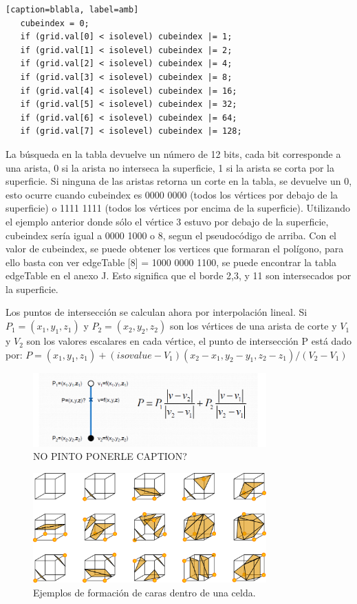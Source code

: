\documentclass[12pt]{article}
\begin{document}
\begin{lstlisting}[frame=single][caption=blabla, label=amb]
   cubeindex = 0;
   if (grid.val[0] < isolevel) cubeindex |= 1;
   if (grid.val[1] < isolevel) cubeindex |= 2;
   if (grid.val[2] < isolevel) cubeindex |= 4;
   if (grid.val[3] < isolevel) cubeindex |= 8;
   if (grid.val[4] < isolevel) cubeindex |= 16;
   if (grid.val[5] < isolevel) cubeindex |= 32;
   if (grid.val[6] < isolevel) cubeindex |= 64;
   if (grid.val[7] < isolevel) cubeindex |= 128;
\end{lstlisting}

La búsqueda en la tabla devuelve un número de 12 bits, cada bit corresponde a una arista, 0 si la arista no interseca la superficie, 1 si la arista se corta por la superficie. Si ninguna de las aristas retorna un corte en la tabla, se devuelve un 0, esto ocurre cuando cubeindex es 0000 0000 (todos los vértices por debajo de la superficie) o 1111 1111 (todos los vértices por encima de la superficie).
Utilizando el ejemplo anterior donde sólo el vértice 3 estuvo por debajo de la superficie, cubeindex sería igual a 0000 1000 o 8, segun el pseudocódigo de arriba. Con el valor de cubeindex, se puede obtener los vertices que formaran el polígono, para ello basta con ver edgeTable [8] = 1000 0000 1100, se puede encontrar la tabla edgeTable en el anexo J. Esto significa que el borde 2,3, y 11 son intersecados por la superficie.

Los puntos de intersección se calculan ahora por interpolación lineal. Si $P_1=(x_1,y_1,z_1)$ y $P_2=(x_2,y_2,z_2)$ son los vértices de una arista de corte y $V_1$ y $V_2$ son los valores escalares en cada vértice, el punto de intersección P está dado por:
$P = (x_1,y_1,z_1) + (isovalue - V_1) (x_2-x_1,y_2-y_1,z_2-z_1) / (V_2 - V_1)$
\begin{figure}[h!]
\includegraphics[width=0.8\textwidth,center]{interpolacion.png}
\caption{NO PINTO PONERLE CAPTION?}
\end{figure}

\begin{figure}[h!]
\includegraphics[width=0.8\textwidth,center]{marchingcubes3.png}
\caption{Ejemplos de formación de caras dentro de una celda.}
\end{figure}
\end{document}
